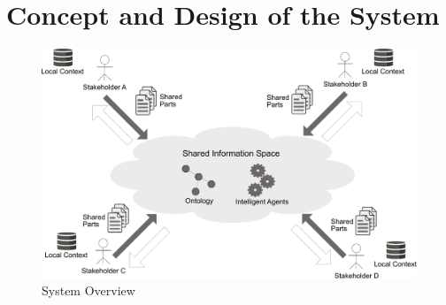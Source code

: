 
\chapter{Concept and Design of the System} %
\label{cha:design_system}

\begin{figure}[H]
	\centering
		\includegraphics[width=0.8\columnwidth]{images/system_overview.pdf}
	\caption{System Overview}
\label{fig:images_system_overview}
\end{figure}

